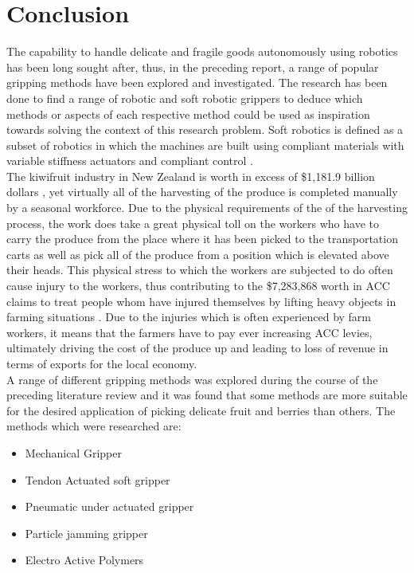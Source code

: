 \documentclass[11pt,twocolumn]{article}
\begin{document}
\section{Conclusion}
The capability to handle delicate and fragile goods autonomously using robotics has been long sought after, thus, in the preceding report, a range of popular gripping methods have been explored and investigated. The research has been done to find a range of robotic and soft robotic grippers to deduce which methods or aspects of each respective method could be used as inspiration towards solving the context of this research problem. Soft robotics is defined as a subset of robotics in which the machines are built using compliant materials with variable stiffness actuators and compliant control \cite{wolf2008actively}.
\\
\newline
The kiwifruit industry in New Zealand is worth in excess of \$1,181.9 billion dollars \cite{fresh_facts_2015}, yet virtually all of the harvesting of the produce is completed manually by a seasonal workforce. Due to the physical requirements of the of the harvesting process, the work does take a great physical toll on the workers who have to carry the produce from the place where it has been picked to the transportation carts as well as pick all of the produce from a position which is elevated above their heads. This physical stress to which the workers are subjected to do often cause injury to the workers, thus contributing to the \$7,283,868 worth in ACC claims to treat people whom have injured themselves by lifting heavy objects in farming situations \cite{injury_statistics_tool_2017}. Due to the injuries which is often experienced by farm workers, it means that the farmers have to pay ever increasing ACC levies, ultimately driving the cost of the produce up and leading to loss of revenue in terms of exports for the local economy.
\\
\newline
A range of different gripping methods was explored during the course of the preceding literature review and it was found that some methods are more suitable for the desired application of picking delicate fruit and berries than others. The methods which were researched are:
\begin{itemize}
\item Mechanical Gripper
\item Tendon Actuated soft gripper
\item Pneumatic under actuated gripper
\item Particle jamming gripper
\item Electro Active Polymers
\end{itemize}
\end{document}

